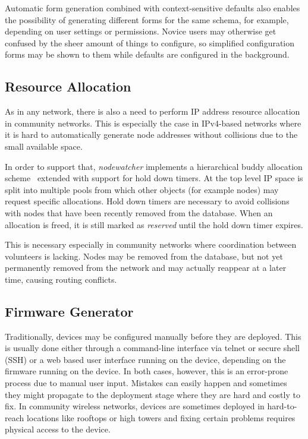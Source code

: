 \documentclass[5p,sort&compress]{elsarticle}
\newcommand{\nodewatcher}{\textit{nodewatcher}}
\begin{document}
Automatic form generation combined with context-sensitive defaults also enables the possibility of generating different forms for the same schema, for example, depending on user settings or permissions.
Novice users may otherwise get confused by the sheer amount of things to configure, so simplified configuration forms may be shown to them while defaults are configured in the background.

\subsection{Resource Allocation}

As in any network, there is also a need to perform IP address resource allocation in community networks.
This is especially the case in IPv4-based networks where it is hard to automatically generate node addresses without collisions due to the small available space.

In order to support that, \nodewatcher{} implements a hierarchical buddy allocation scheme~\cite{Peterson_1977} extended with support for hold down timers.
At the top level IP space is split into multiple pools from which other objects (for example nodes) may request specific allocations.
Hold down timers are necessary to avoid collisions with nodes that have been recently removed from the database.
When an allocation is freed, it is still marked as \textit{reserved} until the hold down timer expires.

This is necessary especially in community networks where coordination between volunteers is lacking.
Nodes may be removed from the database, but not yet permanently removed from the network and may actually reappear at a later time, causing routing conflicts.

\subsection{Firmware Generator}
\label{sec:firmware-generator}

Traditionally, devices may be configured manually before they are deployed.
This is usually done either through a command-line interface via telnet or secure shell (SSH) or a web based user interface running on the device, depending on the firmware running on the device.
In both cases, however, this is an error-prone process due to manual user input.
Mistakes can easily happen and sometimes they might propagate to the deployment stage where they are hard and costly to fix.
In community wireless networks, devices are sometimes deployed in hard-to-reach locations like rooftops or high towers and fixing certain problems requires physical access to the device.
\end{document}
